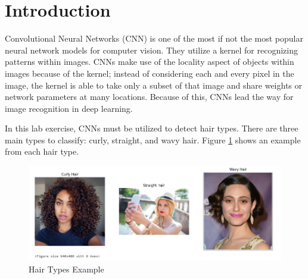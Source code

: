 \section{Introduction}

Convolutional Neural Networks (CNN) is one of the most if not the most popular neural network models for computer vision. They utilize a kernel for recognizing patterns within images. CNNs make use of the locality aspect of objects within images because of the kernel; instead of considering each and every pixel in the image, the kernel is able to take only a subset of that image and share weights or network parameters at many locations. Because of this, CNNs lead the way for image recognition in deep learning. 

In this lab exercise, CNNs must be utilized to detect hair types. There are three main types to classify: curly, straight, and wavy hair. Figure \ref{fig:hairtypes} shows an example from each hair type.

\begin{figure}[H]
  \includegraphics[width=\linewidth]{figures/hairtypes.png}
  \caption{Hair Types Example}
  \label{fig:hairtypes}
\end{figure}
